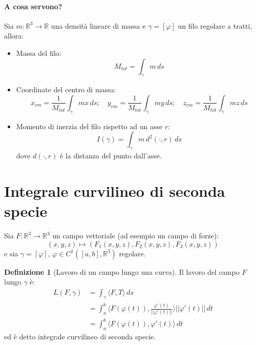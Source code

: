 \documentclass[11pt, a4paper, openright]{book}
\theoremstyle{plain}
\theoremstyle{definition}
\newtheorem{definizione}[teorema]{Definizione}
\theoremstyle{remark}
\newcommand{\innerprod}[2]{\langle #1, #2 \rangle}
\begin{document}
\paragraph{A cosa servono?}
Sia $m: \mathbb{R}^3 \longrightarrow \mathbb{R}$ una densità lineare di massa e $\gamma = [\varphi]$ un filo regolare a tratti, allora:
\begin{itemize}
    \item Massa del filo:
    \begin{equation}
        M_{tot} = \int_\gamma m \, ds
    \end{equation}
    \item Coordinate del centro di massa:
    \begin{equation}
        x_{cm} = \frac{1}{M_{tot}}\int_\gamma mx \, ds; \quad y_{cm} = \frac{1}{M_{tot}}\int_\gamma my \, ds; \quad z_{cm} = \frac{1}{M_{tot}}\int_\gamma mz \, ds
    \end{equation}
    \item Momento di inerzia del filo rispetto ad un asse $r$:
    \begin{equation}
        I(\gamma) = \int_\gamma m \, d^2(\cdot, r) \, ds
    \end{equation}
    dove $d(\cdot, r)$ è la distanza del punto dall'asse.
\end{itemize}

\section{Integrale curvilineo di seconda specie}
Sia $F: \mathbb{R}^3 \longrightarrow \mathbb{R}^3$ un campo vettoriale (ad esempio un campo di forze):
\begin{equation}
    (x, y, z) \longmapsto (F_1(x, y, z), F_2(x, y, z), F_3(x, y, z))
\end{equation}
e sia $\gamma = [\varphi]$, $\varphi \in C^1([a, b], \mathbb{R}^3)$ regolare.

\begin{definizione}[Lavoro di un campo lungo una curva]
    Il lavoro del campo $F$ lungo $\gamma$ è:
    \begin{equation}
        \begin{aligned}
            L(F, \gamma) &= \int_\gamma \innerprod{F}{T} \, ds \\
            &= \int_{a}^{b} \innerprod{F(\varphi(t))}{\frac{\varphi'(t)}{||\varphi'(t)||}} ||\varphi'(t)|| \, dt \\
            &= \int_{a}^{b} \innerprod{F(\varphi(t))}{\varphi'(t)} \, dt
        \end{aligned}
    \end{equation}
    ed è detto integrale curvilineo di seconda specie.
\end{definizione}
\end{document}
